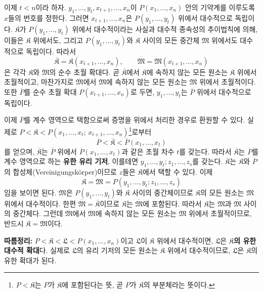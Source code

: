 \documentclass[11pt]{article}
\begin{document}
이제 $t<n$이라 하자. $y_1,\ldots,y_t,x_{t+1},\ldots,x_n$이 $P(x_1,\ldots,x_n)$ 안의 기약계를 이루도록 $x$들의 번호를 정한다. 그러면 $x_{t+1},\ldots,x_n$은 $P(y_1,\ldots,y_t)$ 위에서 대수적으로 독립이다. $\mathfrak K$가 $P(y_1,\ldots,y_t)$ 위에서 대수적이라는 사실과 대수적 종속성의 추이법칙에 의해, 이들은 $\mathfrak K$ 위에서도, 그리고 $P(y_1,\ldots,y_t)$와 $\mathfrak K$ 사이의 모든 중간체 $\mathfrak M$ 위에서도 대수적으로 독립이다. 따라서
\[
\overline{\mathfrak K}=\mathfrak K(x_{t+1},\ldots,x_n),
\qquad
\overline{\mathfrak M}=\mathfrak M(x_{t+1},\ldots,x_n)
\]
은 각각 $\mathfrak K$와 $\mathfrak M$의 순수 초월 확대다. 곧 $\overline{\mathfrak K}$에서 $\mathfrak K$에 속하지 않는 모든 원소는 $\mathfrak K$ 위에서 초월적이고, 마찬가지로 $\overline{\mathfrak M}$에서 $\mathfrak M$에 속하지 않는 모든 원소는 $\mathfrak M$ 위에서 초월적이다. 또한 $\overline P$를 순수 초월 확대 $P(x_{t+1},\ldots,x_n)$로 두면, $y_1,\ldots,y_t$는 $\overline P$ 위에서 대수적으로 독립이다.

이제 $\overline P$를 계수 영역으로 택함으로써 증명을 위에서 처리한 경우로 환원할 수 있다. 실제로 $P<\mathfrak K<P(x_1,\ldots,x_t;\,x_{t+1},\ldots,x_n)$\footnote{$P<\mathfrak K$는 $P$가 $\mathfrak K$에 포함된다는 뜻, 곧 $P$가 $\mathfrak K$의 부분체라는 뜻이다.}로부터
\[
\overline P<\overline{\mathfrak K}<\overline P(x_1,\ldots,x_t)
\]
를 얻으며, $\overline{\mathfrak K}$는 $\overline P$ 위에서 $\overline P(x_1,\ldots,x_t)$과 같은 초월 차수 $t$를 갖는다. 따라서 $\overline{\mathfrak K}$는 $\overline P$를 계수 영역으로 하는 \textbf{유한 유리 기저}, 이를테면 $y_1,\ldots,y_t;z_1,\ldots,z_s$를 갖는다. $\overline{\mathfrak K}$는 $\mathfrak K$와 $\overline P$의 합성체(Vereinigungskörper)이므로 $z$들은 $\mathfrak K$에서 택할 수 있다. 이제
\[
\mathfrak K=\mathfrak M=P(y_1,\ldots,y_t;z_1,\ldots,z_s)
\]
임을 보이면 된다. $\mathfrak M$은 $P(y_1,\ldots,y_t)$와 $\mathfrak K$ 사이의 중간체이므로 $\mathfrak K$의 모든 원소는 $\mathfrak M$ 위에서 대수적이다. 한편 $\overline{\mathfrak M}=\overline{\mathfrak K}$이므로 $\mathfrak K$는 $\overline{\mathfrak M}$에 포함된다. 따라서 $\mathfrak K$는 $\mathfrak M$과 $\overline{\mathfrak M}$ 사이의 중간체다. 그런데 $\overline{\mathfrak M}$에서 $\mathfrak M$에 속하지 않는 모든 원소는 $\mathfrak M$ 위에서 초월적이므로, 반드시 $\mathfrak K=\mathfrak M$이다.

\textbf{따름정리:} $P<\mathfrak K<\mathfrak L<P(x_1,\ldots,x_n)$이고 $\mathfrak L$이 $\mathfrak K$ 위에서 대수적이면, $\mathfrak L$은 \textbf{$\mathfrak K$의 유한 대수적 확대}다. 실제로 $\mathfrak L$의 유리 기저의 모든 원소는 $\mathfrak K$ 위에서 대수적이므로, $\mathfrak L$은 $\mathfrak K$의 유한 확대가 된다.
\end{document}
